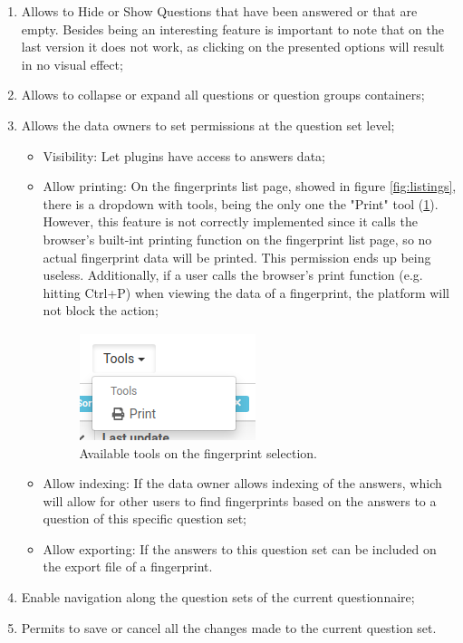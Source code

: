 \begin{enumerate}
    \item Allows to Hide or Show Questions that have been answered or that are empty. Besides being an interesting feature is important to note that on the last version it does not work, as clicking on the presented options will result in no visual effect;
    \item Allows to collapse or expand all questions or question groups containers;
    \item Allows the data owners to set permissions at the question set level;
        \begin{itemize}
            \item Visibility: Let plugins have access to answers data;
            \item Allow printing: On the fingerprints list page, showed in figure \ref{fig:listings}, there is a dropdown with tools, being the only one the "Print" tool (\ref{fig:listings-tools}). However, this feature is not correctly implemented since it calls the browser's built-int printing function on the fingerprint list page, so no actual fingerprint data will be printed. This permission ends up being useless. Additionally, if a user calls the browser's print function (e.g. hitting Ctrl+P) when viewing the data of a fingerprint, the platform will not block the action;
                \begin{figure}[H]
                    \center
                    \includegraphics[width=.2\linewidth]{listings-tools}
                    \caption{Available tools on the fingerprint selection.}
                    \label{fig:listings-tools}
                \end{figure}
            \item Allow indexing: If the data owner allows indexing of the answers, which will allow for other users to find fingerprints based on the answers to a question of this specific question set;
            \item Allow exporting: If the answers to this question set can be included on the export file of a fingerprint.
        \end{itemize}
    \item Enable navigation along the question sets of the current questionnaire;
    \item Permits to save or cancel all the changes made to the current question set.
\end{enumerate}

